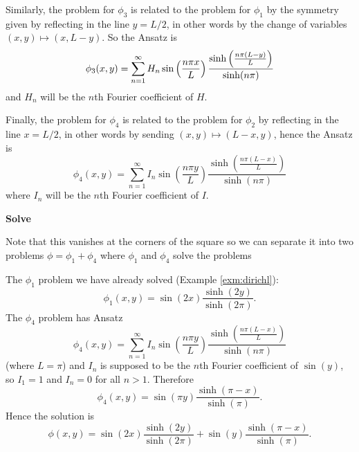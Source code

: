 Similarly, the problem for $\phi_3$ is related to the problem for $\phi_1$ by the symmetry given by reflecting in the line $y=L/2$, in other words by the change of variables $(x,y)\mapsto (x,L-y)$. So the Ansatz is
\[\phi_3(x,y)=\sum_{n=1}^{\infty}H_n\sin\left(\frac{n \pi x}{L}\right)\frac{\sinh\left(\frac{n\pi (L-y)}{L}\right)}{\sinh(n\pi)}\]
and $H_n$ will be the $n$th Fourier coefficient of $H$.

Finally, the problem for $\phi_4$ is related to the problem for $\phi_2$ by reflecting in the line $x=L/2$, in other words by sending $(x,y)\mapsto (L-x,y)$, hence the Ansatz is
\[\phi_4(x,y)=\sum_{n=1}^{\infty}I_n\sin\left(\frac{n\pi y}{L}\right)\frac{\sinh\left(\frac{n\pi (L-x)}{L}\right)}{\sinh(n\pi)}\]
where $I_n$ will be the $n$th Fourier coefficient of $I$.

\begin{exm}
{\bf Solve}


Note that this vanishes at the corners of the square so we can separate it into two problems $\phi=\phi_1+\phi_4$ where $\phi_1$ and $\phi_4$ solve the problems



The $\phi_1$ problem we have already solved (Example \ref{exm:dirichl}):
\[\phi_1(x,y)=\sin(2x)\frac{\sinh(2y)}{\sinh(2\pi)}.\]
The $\phi_4$ problem has Ansatz
\[\phi_4(x,y)=\sum_{n=1}^{\infty}I_n\sin\left(\frac{n\pi y}{L}\right)\frac{\sinh\left(\frac{n\pi (L-x)}{L}\right)}{\sinh(n\pi)}\]
(where $L=\pi$) and $I_n$ is supposed to be the $n$th Fourier coefficient of $\sin(y)$, so $I_1=1$ and $I_n=0$ for all $n>1$. Therefore
\[\phi_4(x,y)=\sin\left(\pi y\right)\frac{\sinh\left(\pi-x\right)}{\sinh(\pi)}.\]
Hence the solution is
\[\phi(x,y)=\sin(2x)\frac{\sinh(2y)}{\sinh(2\pi)}+\sin\left(y\right)\frac{\sinh\left(\pi-x\right)}{\sinh(\pi)}.\]
\end{exm}

